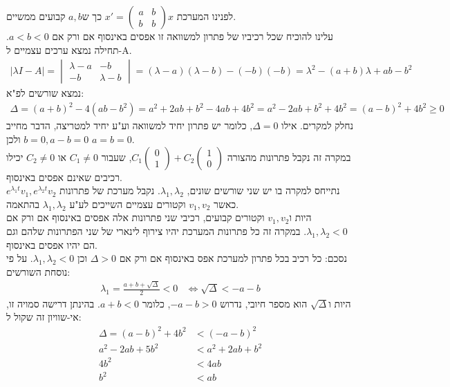 \documentclass{article}
\begin{document}
לפנינו המערכת $x'=\begin{pmatrix}
        a & b \\
        b & b
    \end{pmatrix}x$ כך ש$a,b$ קבועים ממשיים.\\
עלינו להוכיח שכל רכיביו של פתרון למשוואה זו אפסים באינסוף אם ורק אם $a<b<0$. תחילה נמצא ערכים עצמיים ל-A.
\begin{align*}
    |\lambda I - A|=\begin{vmatrix}
                        \lambda-a & -b        \\
                        -b        & \lambda-b
                    \end{vmatrix}=(\lambda-a)(\lambda-b)-(-b)(-b)=\lambda^2-(a+b)\lambda+ab-b^2
\end{align*}
נמצא שורשים לפ"א:
\begin{align*}
    \Delta=(a+b)^2-4(ab-b^2)=a^2+2ab+b^2-4ab+4b^2=a^2-2ab+b^2+4b^2=(a-b)^2+4b^2\geq 0
\end{align*}
נחלק למקרים. אילו $\Delta=0$, כלומר יש פתרון יחיד למשוואה וע"ע יחיד למטריצה, הדבר מחייב $b=0, a-b=0$ ולכן $a=b=0$.\\
במקרה זה נקבל פתרונות מהצורה $C_1\begin{pmatrix}
        0 \\
        1
    \end{pmatrix}+C_2\begin{pmatrix}
        1 \\
        0
    \end{pmatrix}$, שעבור $C_1\ne 0$ או $C_2\ne 0$ יכילו רכיבים שאינם אפסים באינסוף.\\
נתייחס למקרה בו יש שני שורשים שונים, $\lambda_1, \lambda_2$. נקבל מערכת של פתרונות $e^{\lambda_1t}v_1, e^{\lambda_2t}v_2$ כאשר $v_1, v_2$ וקטורים עצמיים השייכים לע"ע $\lambda_1, \lambda_2$ בהתאמה.\\
היות ו$v_1, v_2$ וקטורים קבועים, רכיבי שני פתרונות אלה אפסים באינסוף אם ורק אם $\lambda_1, \lambda_2<0$. במקרה זה כל פתרונות המערכת יהיו צירוף לינארי של שני הפתרונות שלהם וגם הם יהיו אפסים באינסוף.\\
נסכם: כל רכיב בכל פתרון למערכת אפס באינסוף אם ורק אם $\Delta>0$ וכן $\lambda_1, \lambda_2<0$.
על פי נוסחת השורשים:
\begin{align*}
    \lambda_1=\frac{a+b+\sqrt{\Delta}}{2}<0 & \Leftrightarrow\sqrt{\Delta}<-a-b
\end{align*}
היות ו$\sqrt{\Delta}$ הוא מספר חיובי, נדרוש $-a-b>0$, כלומר $a+b<0$. בהינתן דרישה סמויה זו, אי-שוויון זה שקול ל:
\begin{align*}
    \Delta=(a-b)^2+4b^2 & <(-a-b)^2    \\
    a^2-2ab+5b^2        & <a^2+2ab+b^2 \\
    4b^2                & <4ab         \\
    b^2                 & <ab
\end{align*}
\end{document}
